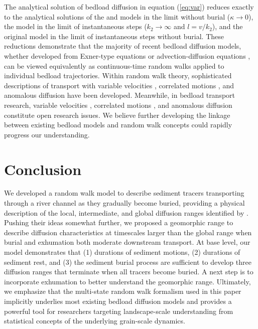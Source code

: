 The analytical solution of bedload diffusion in equation (\ref{eq:var}) reduces exactly to the analytical solutions of the \citet{Lisle1998} and \citet{Lajeunesse2017} models in the limit without burial ($\kappa \rightarrow 0$), the \citet{Wu2019} model in the limit of instantaneous steps ($k_2 \rightarrow \infty$ and $l = v/k_2$), and the original \citet{Einstein1937} model in the limit of instantaneous steps without burial.
These reductions demonstrate that the majority of recent bedload diffusion models, whether developed from Exner-type equations \citep{Wu2019,Pelosi2014,Pelosi2016} or advection-diffusion equations \citep{Lisle1998,Lajeunesse2017}, can be viewed equivalently as continuous-time random walks applied to individual bedload trajectories.
Within random walk theory, sophisticated descriptions of transport with variable velocities \citep{Zaburdaev2008,Masoliver1994}, correlated motions \citep{Escaff2018,Vicsek2012a}, and anomalous diffusion \citep{Masoliver2016,Fa2014,Metzler2014} have been developed.
Meanwhile, in bedload transport research, variable velocities \citep{Lajeunesse2010,Furbish2012,Heyman2016}, correlated motions \citep{Heyman2014,Lee2018,Saletti2020}, and anomalous diffusion \citep{Fathel2016,Bradley2017,Schumer2009} constitute open research issues.
We believe further developing the linkage between existing bedload models and random walk concepts could rapidly progress our understanding.

\section{Conclusion}
\label{sec:conclusion}
We developed a random walk model to describe sediment tracers transporting through a river channel as they gradually become buried, providing a physical description of the local, intermediate, and global diffusion ranges identified by \citet{Nikora2002}.
Pushing their ideas somewhat further, we proposed a geomorphic range to describe diffusion characteristics at timescales larger than the global range when burial and exhumation both moderate downstream transport.
At base level, our model demonstrates that (1) durations of sediment motions, (2) durations of sediment rest, and (3) the sediment burial process are sufficient to develop three diffusion ranges that terminate when all tracers become buried.
A next step is to incorporate exhumation to better understand the geomorphic range.
Ultimately, we emphasize that the multi-state random walk formalism used in this paper implicitly underlies most existing bedload diffusion models and provides a powerful tool for researchers targeting landscape-scale understanding from statistical concepts of the underlying grain-scale dynamics.
